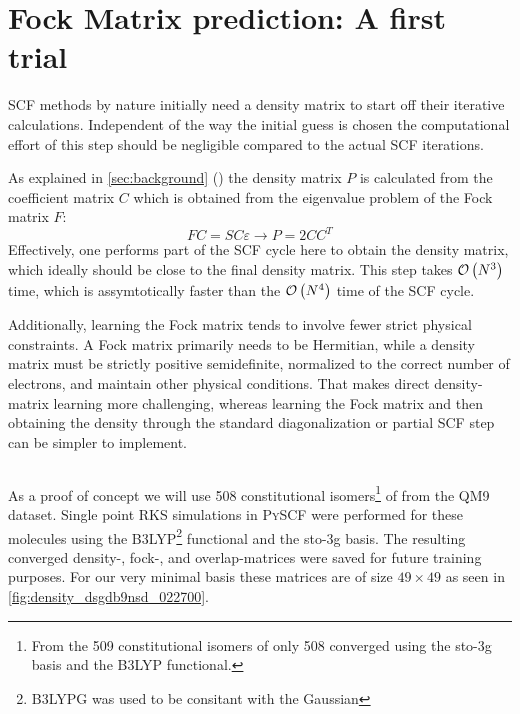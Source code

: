\section{Fock Matrix prediction: A first trial}
\label{sec:first_predictions}
SCF methods by nature initially need a density matrix to start off their iterative calculations. Independent of the way the initial guess is chosen the computational effort of this step should be negligible compared to the actual SCF iterations. 

As explained in \autoref{sec:background} () the density matrix $P$ is calculated from the coefficient matrix $C$ which is obtained from the eigenvalue problem of the Fock matrix $F$:
\begin{equation}
    FC = SC\varepsilon \rightarrow P = 2CC^T
\end{equation}
Effectively, one performs part of the SCF cycle here to obtain the density matrix, which ideally should be close to the final density matrix. This step takes $\mathcal{O}\left(N^3\right)$ time, which is assymtotically faster than the $\mathcal{O}\left(N^4\right)$ time of the SCF cycle. 

Additionally, learning the Fock matrix tends to involve fewer strict physical constraints. A Fock matrix primarily needs to be Hermitian, while a density matrix must be strictly positive semidefinite, normalized to the correct number of electrons, and maintain other physical conditions. That makes direct density-matrix learning more challenging, whereas learning the Fock matrix and then obtaining the density through the standard diagonalization or partial SCF step can be simpler to implement. 


\subsection{}
\label{subsec:qm9_c5h4n2o2}
As a proof of concept we will use 508 constitutional isomers\footnote{From the 509 constitutional isomers of  only 508 converged using the sto-3g basis and the B3LYP functional.} of  from the QM9 dataset. 
Single point RKS simulations in \textsc{PySCF} \parencite{ref:pyscf} were performed for these molecules using the B3LYP\footnote{B3LYPG was used to be consitant with the Gaussian} functional and the sto-3g basis. The resulting converged density-, fock-, and overlap-matrices were saved for future training purposes. For our very minimal basis these matrices are of size $49 \times 49$ as seen in \autoref{fig:density_dsgdb9nsd_022700}. 

